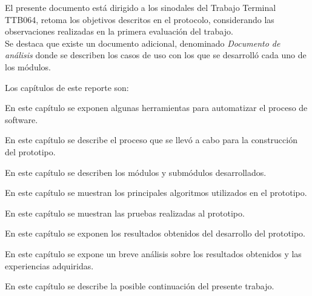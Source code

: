 	El presente documento está dirigido a los sinodales del Trabajo Terminal TTB064, retoma los objetivos descritos en el protocolo, considerando las observaciones realizadas en la primera evaluación del trabajo.\\
	
	Se destaca que existe un documento adicional, denominado {\it Documento de análisis} donde se describen los casos de uso con los que se desarrolló cada uno de los módulos.
	
	Los capítulos de este reporte son:

\begin{Citemize}
	\item {} En este capítulo se exponen algunas herramientas para automatizar el proceso de software.
	\item {} En este capítulo se describe el proceso que se llevó a cabo para la construcción del prototipo.
	\item {} En este capítulo se describen los módulos y submódulos desarrollados.
	\item {} En este capítulo se muestran los principales algoritmos utilizados en el prototipo.
	\item {} En este capítulo se muestran las pruebas realizadas al prototipo.
	\item {} En este capítulo se exponen los resultados obtenidos del desarrollo del prototipo.
	\item {} En este capítulo se expone un breve análisis sobre los resultados obtenidos y las experiencias adquiridas.
	\item {} En este capítulo se describe la posible continuación del presente trabajo.

\end{Citemize}


